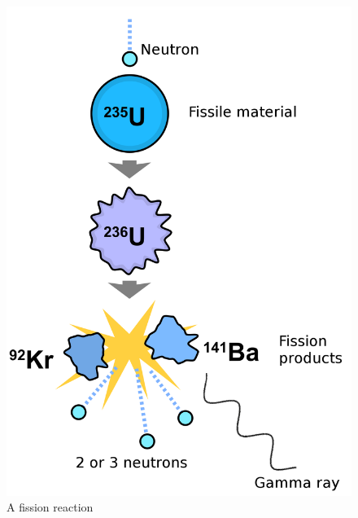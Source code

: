 \documentclass[11pt,oneside,a4paper]{book}
\renewcommand*{\thepage}{\small\thepage}
\begin{document}
\begin{figure}
\centering
\includegraphics[scale=0.15]{gfx/nuclear-fission.png}
\caption{\label{fig:nuclear-fission}A fission reaction}
\end{figure}

\begin{singlespace}
    


    \end{singlespace}
\end{document}
